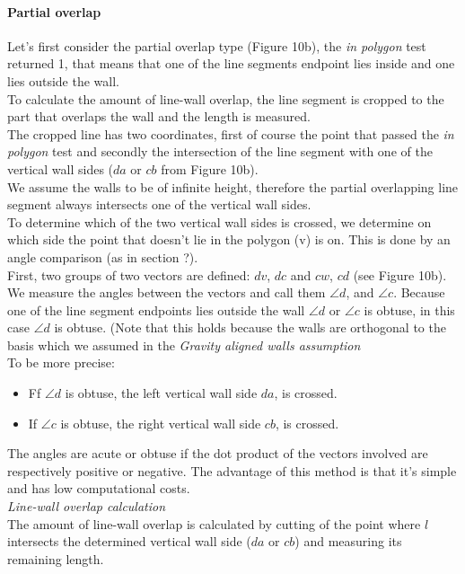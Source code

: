 	\paragraph{Partial overlap}
	Let's first consider the partial overlap type (Figure 10b), the \emph{in polygon} test
	returned 1, that means that one of the line segments endpoint lies inside
	and one lies outside the wall.\\
	To calculate the amount of line-wall overlap, the line segment is cropped to the
	part that overlaps the wall and the length is measured.\\
	The cropped line has two coordinates, first of course the point that passed
	the \emph{in polygon} test and secondly the intersection of the line
	segment with one of the vertical wall sides ($da$ or $cb$ from Figure 10b).\\
	We assume the walls to be of infinite height, therefore the 
	partial overlapping line segment always intersects one of the
	vertical wall sides.\\
	To determine which of the two vertical wall sides is crossed, we determine
	on which side the point that doesn't lie in the polygon (v) is on.  This is
	done by an angle comparison (as in section ?).\\
	First, two groups of two vectors are defined: $dv$, $dc$ and $cw$, $cd$ (see Figure 10b).
	We measure the angles between the vectors and call them $\angle d$, and
	$\angle c$. 
	Because one of the line segment endpoints lies outside
	the wall $\angle d$ or $\angle c$ is obtuse, in this case $\angle d$ is obtuse.
	(Note that this holds because the walls are orthogonal to the basis
	which we assumed in the \emph{Gravity aligned walls assumption}\\
	To be more precise: 
	\begin{itemize}
	\item Ff $\angle d$ is obtuse, the left vertical wall side $da$, is
	crossed. \\
	\item If $\angle c$ is obtuse, the right vertical wall side $cb$, is
	crossed. \\
	\end{itemize}
	The angles are acute or obtuse if the dot product of the vectors involved
	are respectively positive or negative. The advantage of this method is that
	it's simple and has low computational costs.\\
	
	\emph{Line-wall overlap calculation}\\
	The amount of line-wall overlap is calculated by cutting of the
	point where $l$ intersects the determined vertical wall side ($da$ or
	$cb$) and measuring its remaining length.\\

